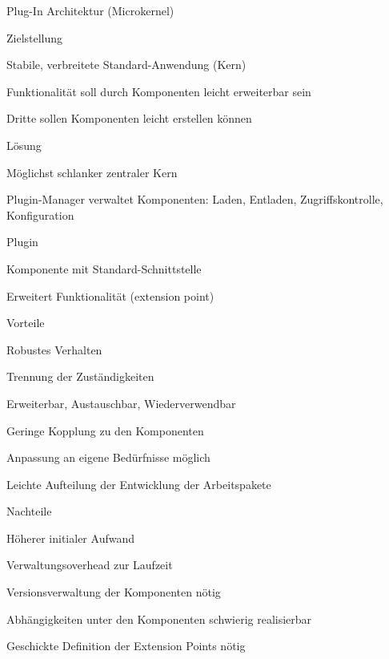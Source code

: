 \documentclass[a4paper]{article}
\begin{document}
\begin{multicols}{3}
  Plug-In Architektur (Microkernel)
  \begin{itemize*}
    \item Zielstellung
    \begin{itemize*}
      \item Stabile, verbreitete Standard-Anwendung (Kern)
      \item Funktionalität soll durch Komponenten leicht erweiterbar sein
      \item Dritte sollen Komponenten leicht erstellen können
    \end{itemize*}
    \item Lösung
    \begin{itemize*}
      \item Möglichst schlanker zentraler Kern
      \item Plugin-Manager verwaltet Komponenten: Laden, Entladen, Zugriffskontrolle, Konfiguration
    \end{itemize*}
    \item Plugin
    \begin{itemize*}
      \item Komponente mit Standard-Schnittstelle
      \item Erweitert Funktionalität (extension point)
    \end{itemize*}
    \item Vorteile
    \begin{itemize*}
      \item Robustes Verhalten
      \item Trennung der Zuständigkeiten
      \item Erweiterbar, Austauschbar, Wiederverwendbar
      \item Geringe Kopplung zu den Komponenten
      \item Anpassung an eigene Bedürfnisse möglich
      \item Leichte Aufteilung der Entwicklung der Arbeitspakete
    \end{itemize*}
    \item Nachteile
    \begin{itemize*}
      \item Höherer initialer Aufwand
      \item Verwaltungsoverhead zur Laufzeit
      \item Versionsverwaltung der Komponenten nötig
      \item Abhängigkeiten unter den Komponenten schwierig realisierbar
      \item Geschickte Definition der Extension Points nötig
    \end{itemize*}
  \end{itemize*}


\end{multicols}
\end{document}
